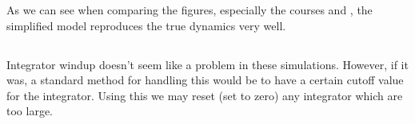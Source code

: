 As we can see when comparing the figures, especially the courses  and , the simplified model reproduces the true dynamics very well. 

\subsection{}
Integrator windup doesn't seem like a problem in these simulations. However, if it was, a standard method for handling this would be to have a certain cutoff value for the integrator. Using this we may reset (set to zero) any integrator which are too large. 
